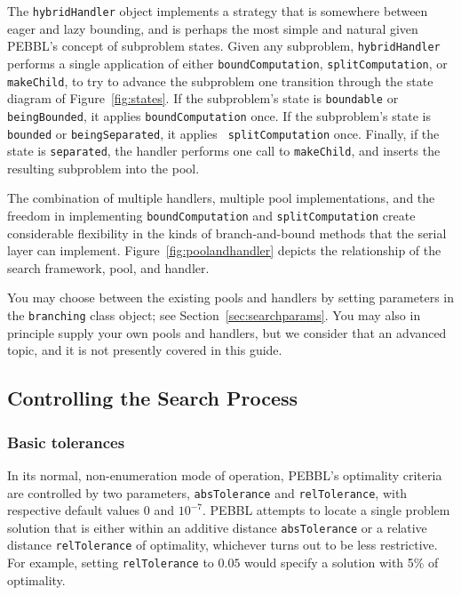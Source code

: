 The \texttt{hybridHandler} object implements a strategy that is somewhere
between eager and lazy bounding, and is perhaps the most simple and
natural given PEBBL's concept of subproblem states.  Given any
subproblem, \texttt{hybridHandler} performs a single application of
either \texttt{boundComputation}, \texttt{splitComputation}, or
\texttt{makeChild}, to try to advance the subproblem one transition
through the state diagram of Figure~\ref{fig:states}.  
If the subproblem's state is
\texttt{boundable} or \texttt{beingBounded}, it applies
\texttt{boundComputation} once.  If the subproblem's state is
\texttt{bounded} or \texttt{beingSeparated}, it applies {\tt
splitComputation} once.  Finally, if the state is \texttt{separated},
the handler performs one call to \texttt{makeChild}, and inserts the
resulting subproblem into the pool.

The combination of multiple handlers, multiple pool implementations,
and the freedom in implementing \texttt{boundComputation} and
\texttt{splitComputation} create considerable flexibility in the kinds
of branch-and-bound methods that the serial layer can implement.
Figure~\ref{fig:poolandhandler} depicts the relationship of the search
framework, pool, and handler.

You may choose between the existing pools and handlers by setting
parameters in the \texttt{branching} class object; see
Section~\ref{sec:searchparams}.  You may also in principle supply
your own pools and handlers, but we consider that an advanced topic,
and it is not presently covered in this guide.


\subsection{Controlling the Search Process}

\subsubsection{Basic tolerances}

In its normal, non-enumeration 
mode of operation, PEBBL's optimality criteria are
controlled by two parameters, \texttt{absTolerance} and
\texttt{relTolerance}, with respective default values $0$ and
$10^{-7}$. PEBBL attempts to locate a single problem solution that is
either within an additive distance \texttt{absTolerance} or a relative
distance \texttt{relTolerance} of optimality, whichever turns out to
be less restrictive.  For example, setting \texttt{relTolerance} to
$0.05$ would specify a solution with 5\% of optimality.


